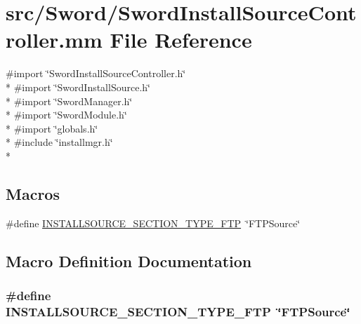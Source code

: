 \hypertarget{_sword_install_source_controller_8mm}{\section{src/\-Sword/\-Sword\-Install\-Source\-Controller.mm File Reference}
\label{_sword_install_source_controller_8mm}
}
{\ttfamily \#import \char`\"{}Sword\-Install\-Source\-Controller.\-h\char`\"{}}\\*
{\ttfamily \#import \char`\"{}Sword\-Install\-Source.\-h\char`\"{}}\\*
{\ttfamily \#import \char`\"{}Sword\-Manager.\-h\char`\"{}}\\*
{\ttfamily \#import \char`\"{}Sword\-Module.\-h\char`\"{}}\\*
{\ttfamily \#import \char`\"{}globals.\-h\char`\"{}}\\*
{\ttfamily \#include \char`\"{}installmgr.\-h\char`\"{}}\\*
\subsection*{Macros}
\begin{DoxyCompactItemize}
\item 
\#define \hyperlink{_sword_install_source_controller_8mm_a47477916222e1cf2cdd82f6dd05132cb}{I\-N\-S\-T\-A\-L\-L\-S\-O\-U\-R\-C\-E\-\_\-\-S\-E\-C\-T\-I\-O\-N\-\_\-\-T\-Y\-P\-E\-\_\-\-F\-T\-P}~\char`\"{}F\-T\-P\-Source\char`\"{}
\end{DoxyCompactItemize}


\subsection{Macro Definition Documentation}
\hypertarget{_sword_install_source_controller_8mm_a47477916222e1cf2cdd82f6dd05132cb}{
\subsubsection[{I\-N\-S\-T\-A\-L\-L\-S\-O\-U\-R\-C\-E\-\_\-\-S\-E\-C\-T\-I\-O\-N\-\_\-\-T\-Y\-P\-E\-\_\-\-F\-T\-P}]{\setlength{\rightskip}{0pt plus 5cm}\#define I\-N\-S\-T\-A\-L\-L\-S\-O\-U\-R\-C\-E\-\_\-\-S\-E\-C\-T\-I\-O\-N\-\_\-\-T\-Y\-P\-E\-\_\-\-F\-T\-P~\char`\"{}F\-T\-P\-Source\char`\"{}}}\label{_sword_install_source_controller_8mm_a47477916222e1cf2cdd82f6dd05132cb}

